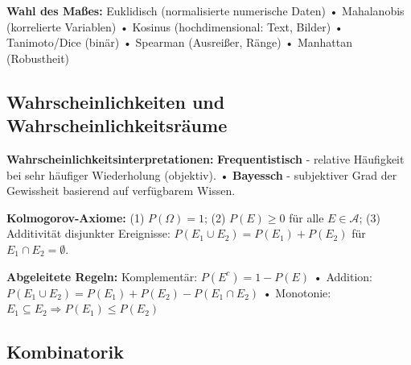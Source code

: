 \textbf{Wahl des Maßes:} Euklidisch (normalisierte numerische Daten) • Mahalanobis (korrelierte Variablen) • Kosinus (hochdimensional: Text, Bilder) • Tanimoto/Dice (binär) • Spearman (Ausreißer, Ränge) • Manhattan (Robustheit)

\newpage

\subsection{Wahrscheinlichkeiten und Wahrscheinlichkeitsräume}


\textbf{Wahrscheinlichkeitsinterpretationen:}
\textbf{Frequentistisch} - relative Häufigkeit bei sehr häufiger Wiederholung (objektiv). • 
\textbf{Bayessch} - subjektiver Grad der Gewissheit basierend auf verfügbarem Wissen.


\textbf{Kolmogorov-Axiome:}
(1) $P(\Omega) = 1$; 
(2) $P(E) \geq 0$ für alle $E \in \mathcal{A}$; 
(3) Additivität disjunkter Ereignisse: $P(E_1 \cup E_2) = P(E_1) + P(E_2)$ für $E_1 \cap E_2 = \emptyset$.


\textbf{Abgeleitete Regeln:}
Komplementär: $P(E^c) = 1-P(E)$ • 
Addition: $P(E_1 \cup E_2) = P(E_1) + P(E_2) - P(E_1 \cap E_2)$ • 
Monotonie: $E_1 \subseteq E_2 \Rightarrow P(E_1) \leq P(E_2)$

\newpage





\subsection{Kombinatorik}



